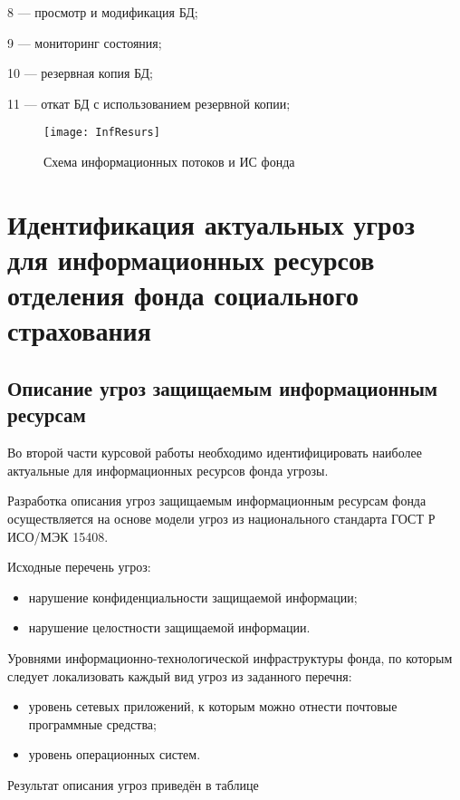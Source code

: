 8 --- просмотр и модификация БД;

9 --- мониторинг состояния;

10 --- резервная копия БД;

11 --- откат БД с использованием резервной копии;

\begin{figure}[h]
  \centering
  \texttt{[image: InfResurs]}
  \caption{Схема информационных потоков и ИС фонда}
  \label{fig:infresurs}  
\end{figure}

\cleardoublepage

\section{Идентификация актуальных угроз для информационных ресурсов
  отделения фонда социального страхования}
\label{sec:2}

\subsection{Описание угроз защищаемым информационным ресурсам}

\point Во второй части курсовой работы необходимо идентифицировать наиболее
актуальные для информационных ресурсов фонда угрозы.

Разработка описания угроз защищаемым информационным ресурсам фонда
осуществляется на основе модели угроз из национального стандарта ГОСТ
Р ИСО/МЭК 15408.

\point Исходные перечень угроз:

\begin{itemize}
\item нарушение конфиденциальности защищаемой информации;
\item нарушение целостности защищаемой информации.
\end{itemize}

\point Уровнями информационно-технологической инфраструктуры фонда, по
которым следует локализовать каждый вид угроз из заданного перечня:

\begin{itemize}
\item уровень сетевых приложений, к которым можно отнести почтовые
  программные средства;
\item уровень операционных систем.
\end{itemize}

Результат описания угроз приведён в таблице


